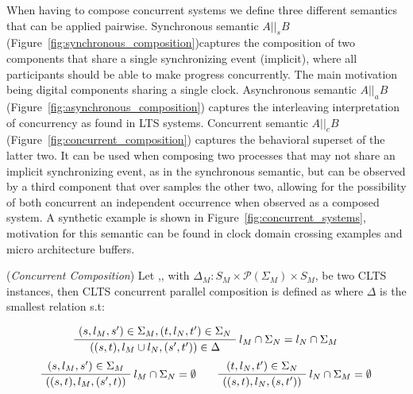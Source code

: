 
When having to compose concurrent systems we define three different semantics that can be applied pairwise. Synchronous semantic $A ||_s B$ (Figure~\ref{fig:synchronous_composition})captures the composition of two components that share a single synchronizing event (implicit), where all participants should be able to make progress concurrently. The main motivation being digital components sharing a single clock. 
Asynchronous semantic $A ||_a B$ (Figure~\ref{fig:asynchronous_composition}) captures the interleaving interpretation of concurrency as found in LTS systems. Concurrent semantic $A ||_c B$ (Figure~\ref{fig:concurrent_composition}) captures the behavioral superset of the latter two. It can be used when composing two processes that may not share an implicit synchronizing event, as in the synchronous semantic, but can be observed by a third component that over samples the other two, allowing for the possibility of both concurrent an independent occurrence when observed as a composed system. A synthetic example is shown in Figure~\ref{fig:concurrent_systems}, motivation for this semantic can be found in clock domain crossing examples and micro architecture buffers.



\begin{definition} 
	\label{def:concurrent_composition}(\emph{Concurrent Composition})	Let ,, with $\Delta_M : S_M \times \mathcal{P}(\Sigma_M) \times S_M$, be two CLTS instances, then CLTS concurrent parallel composition is defined as  where $\Delta$ is the smallest relation s.t:
	\begin{center}
		\begin{equation}
		\AxiomC{$(s, l_M, s') \in \Sigma_M,(t, l_N, t') \in \Sigma_N  $}\RightLabel{$l_M \cap \Sigma_N = l_N \cap \Sigma_M$}
		\UnaryInfC{$((s,t),l_M \cup l_N,(s',t')) \in \Delta$}
		\DisplayProof
		\end{equation}	
		\begin{equation}
		\AxiomC{$(s, l_M, s') \in \Sigma_M $}\RightLabel{$l_M \cap \Sigma_N = \emptyset$}
		\UnaryInfC{$((s,t),l_M,(s',t))$}
		\DisplayProof
		\quad\quad
		\AxiomC{$(t, l_N, t') \in \Sigma_N $}\RightLabel{$l_N \cap \Sigma_M = \emptyset$}
		\UnaryInfC{$((s,t),l_N,(s,t'))$}
		\DisplayProof
		\end{equation}
	\end{center}
\end{definition}

